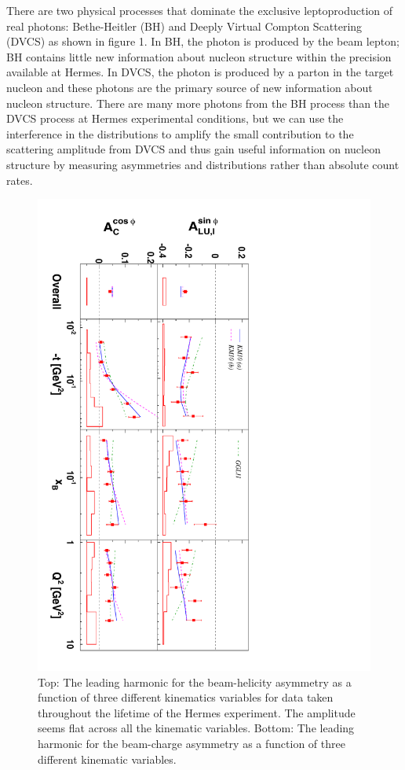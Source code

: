 \documentclass[11pt]{article}
\begin{document}
There are two physical processes that dominate the exclusive leptoproduction of real photons: Bethe-Heitler (BH) and Deeply Virtual Compton Scattering (DVCS) as shown in figure 1. In BH, the photon is produced by the beam lepton; BH contains little new information about nucleon structure within the precision available at H{\sc ermes}. In DVCS, the photon is produced by a parton in the target nucleon and these photons are the primary source of new information about nucleon structure. There are many more photons from the BH process than the DVCS process at H{\sc ermes} experimental conditions, but we can use the interference in the distributions to amplify the small contribution to the scattering amplitude from DVCS and thus gain useful information on nucleon structure by measuring asymmetries and distributions rather than absolute count rates.

\begin{figure}[ht]
\begin{center}
\includegraphics[angle=90,width=\textwidth]{dc90_data}
\caption{Top: The leading harmonic for the beam-helicity asymmetry as a function of three different kinematics variables for data taken throughout the lifetime of the H{\sc ermes} experiment. The amplitude seems flat across all the kinematic variables. Bottom: The leading harmonic for the beam-charge asymmetry as a function of three different kinematic variables. }
\end{center}
\end{figure}
\end{document}
